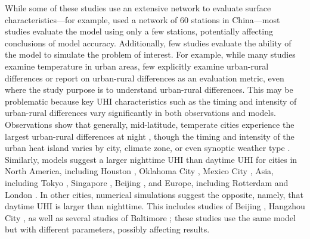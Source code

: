 While some of these studies use an extensive network to evaluate surface characteristics---for example, \cite{miao2011impacts} used a network of 60 stations in China---most studies evaluate the model using only a few stations, potentially affecting conclusions of model accuracy. 
Additionally, few studies evaluate the ability of the model to simulate the problem of interest.
For example, while many studies examine temperature in urban areas, few explicitly examine urban-rural differences or report on urban-rural differences as an evaluation metric, even where the study purpose is to understand urban-rural differences.
This may be problematic because key UHI characteristics such as the timing and intensity of urban-rural differences vary significantly in both observations and models. 
Observations show that generally, mid-latitude, temperate cities experience the largest urban-rural differences at night \citep{oke82,scott2018reduced}, though the timing and intensity of the urban heat island varies by city, climate zone, or even synoptic weather type \citep{hardin2017urban}. 
Similarly, models suggest a larger nighttime UHI than daytime UHI for cities in North America, including Houston \citep{chen2011numerical}, Oklahoma City \citep{hu2013impact}, Mexico City \citep{cui2012seasonal}, Asia, including Tokyo \citep{kusaka2012urban}, Singapore \citep{li2013multi}, Beijing \citep{wang2013contribution}, and Europe, including Rotterdam \citep{theeuwes2014seasonal} and London \citep{grawe2013modelling}.
In other cities, numerical simulations suggest the opposite, namely, that daytime UHI is larger than nighttime. This includes studies of Beijing \citep{zhang2011impact}, Hangzhou City \citep{chen2014wrf}, as well as several studies of Baltimore \citep{zhang2011impact,li2013synergistic, li2015contrasting}; these studies use the same model but with different parameters, possibly affecting results. 


